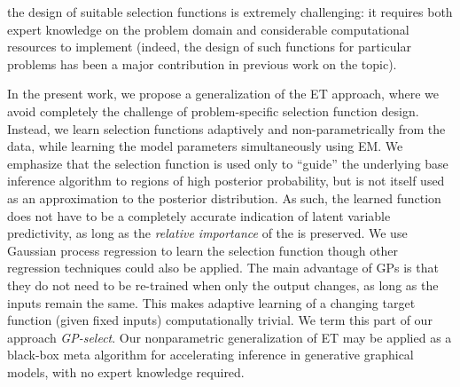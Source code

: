 the design of suitable selection functions is extremely challenging: it requires both expert knowledge
on the problem domain and considerable computational resources to implement
 (indeed, the design of such functions for  particular problems
has been a major contribution in previous work on the topic).

In the present work, we propose a generalization of the ET approach, where
we avoid completely the challenge of problem-specific selection function design.
Instead, we learn selection functions  adaptively and non-parametrically
from the data,
 while learning the model
parameters  simultaneously using EM.
We emphasize that the selection function is  used only to ``guide'' the underlying
base inference algorithm to regions of high posterior probability, but is not itself
used as an approximation to the posterior distribution. 
As such, the learned
function does not have to be a completely accurate indication of latent
variable predictivity,
as long as the \emph{relative importance} of the  is preserved.
We use  Gaussian process
regression \citep{RasmussenGPbook} to learn the selection function  though other regression techniques could
also be applied. 
The main advantage of GPs is that they do not need to be re-trained when only the output changes, as long as the inputs remain the same. 
This makes adaptive learning of a changing target function (given fixed inputs) computationally trivial.
We term this part of our approach
\textit{GP-select}.
Our nonparametric generalization of  ET may be applied as a black-box
meta algorithm for accelerating inference in  generative graphical models,
with no expert knowledge required.



